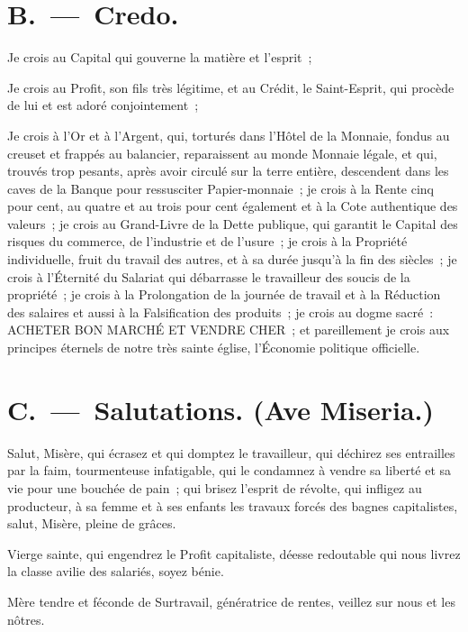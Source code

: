 \documentclass[french,twoside]{book} %
\begin{document}
\section[{B. — Credo.}]{B. — Credo.}
Je crois au Capital qui gouverne la matière et l’esprit ;\par
Je crois au Profit, son fils très légitime, et au Crédit, le Saint-Esprit, qui procède de lui et est adoré conjointement ;\par
Je crois à l’Or et à l’Argent, qui, torturés dans l’Hôtel de la Monnaie, fondus au creuset et frappés au balancier, reparaissent au monde Monnaie légale, et qui, trouvés trop pesants, après avoir circulé sur la terre entière, descendent dans les caves de la Banque pour ressusciter Papier-monnaie ; je crois à la Rente cinq pour cent, au quatre et au trois pour cent également et à la Cote authentique des valeurs ; je crois au Grand-Livre de la Dette publique, qui garantit le Capital des risques du commerce, de l’industrie et de l’usure ; je crois à la Propriété individuelle, fruit du travail des autres, et à sa durée jusqu’à la fin des siècles ; je crois à l’Éternité du Salariat qui débarrasse le travailleur des soucis de la propriété ; je crois à la Prolongation de la journée de travail et à la Réduction des salaires et aussi à la Falsification des produits ; je crois au dogme sacré : ACHETER BON MARCHÉ ET VENDRE CHER ; et pareillement je crois aux principes éternels de notre très sainte église, l’Économie politique officielle.\par

\begin{center}
\end{center}

\section[{C. — Salutations. (Ave Miseria.)}]{C. — Salutations. (Ave Miseria.)}
\noindent Salut, Misère, qui écrasez et qui domptez le travailleur, qui déchirez ses entrailles par la faim, tourmenteuse infatigable, qui le condamnez à vendre sa liberté et sa vie pour une bouchée de pain ; qui brisez l’esprit de révolte, qui infligez au producteur, à sa femme et à ses enfants les travaux forcés des bagnes capitalistes, salut, Misère, pleine de grâces.\par
Vierge sainte, qui engendrez le Profit capitaliste, déesse redoutable qui nous livrez la classe avilie des salariés, soyez bénie.\par
Mère tendre et féconde de Surtravail, génératrice de rentes, veillez sur nous et les nôtres.\par
\end{document}
